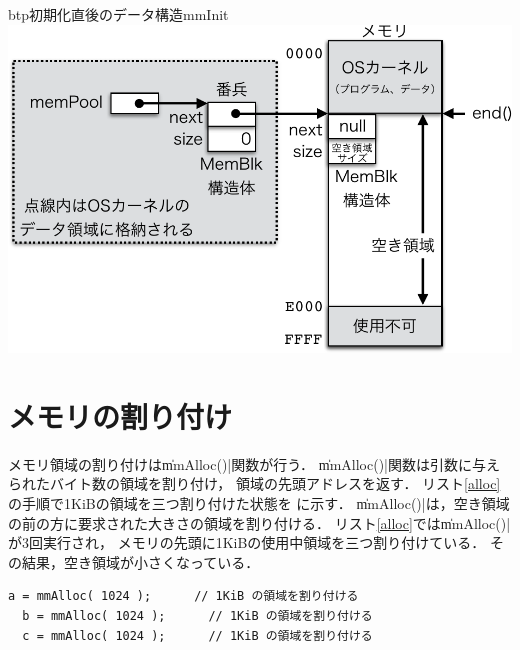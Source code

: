 \begin{myfig}{btp}{初期化直後のデータ構造}{mmInit}
  \includegraphics[scale=0.66]{Fig/mmInit-crop.pdf}
\end{myfig}

\section{メモリの割り付け}
メモリ領域の割り付けは\|mmAlloc()|関数が行う．
\|mmAlloc()|関数は引数に与えられたバイト数の領域を割り付け，
領域の先頭アドレスを返す．
リスト\ref{alloc}の手順で1KiBの領域を三つ割り付けた状態を
に示す．
\|mmAlloc()|は，空き領域の前の方に要求された大きさの領域を割り付ける．
リスト\ref{alloc}では\|mmAlloc()|が3回実行され，
メモリの先頭に1KiBの使用中領域を三つ割り付けている．
その結果，空き領域が小さくなっている．

\begin{lstlisting}[float=btp,label=alloc, caption=1KiBの領域を三つ割り付ける]
  a = mmAlloc( 1024 );      // 1KiB の領域を割り付ける
  b = mmAlloc( 1024 );      // 1KiB の領域を割り付ける
  c = mmAlloc( 1024 );      // 1KiB の領域を割り付ける
\end{lstlisting}

